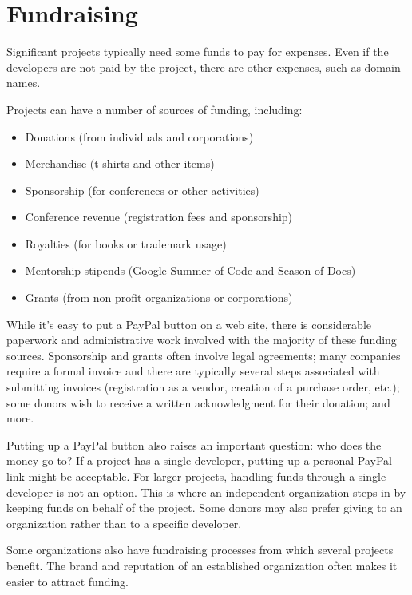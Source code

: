 


\chapter{Fundraising}

Significant projects typically need some funds to pay for expenses.  Even if the developers are not paid by the project, there are other expenses, such as domain names.

Projects can have a number of sources of funding, including:

\begin{itemize}

\item Donations (from individuals and corporations)
\item Merchandise (t-shirts and other items)
\item Sponsorship (for conferences or other activities)
\item Conference revenue (registration fees and sponsorship)
\item Royalties (for books or trademark usage)
\item Mentorship stipends (Google Summer of Code and Season of Docs)
\item Grants (from non-profit organizations or corporations)

\end{itemize}

While it's easy to put a PayPal button on a web site, there is considerable paperwork and administrative work involved with the majority of these funding sources.  Sponsorship and grants often involve legal agreements; many companies require a formal invoice and there are typically several steps associated with submitting invoices (registration as a vendor, creation of a purchase order, etc.); some donors wish to receive a written acknowledgment for their donation; and more.

Putting up a PayPal button also raises an important question: who does the money go to?  If a project has a single developer, putting up a personal PayPal link might be acceptable.  For larger projects, handling funds through a single developer is not an option.  This is where an independent organization steps in by keeping funds on behalf of the project.  Some donors may also prefer giving to an organization rather than to a specific developer.

Some organizations also have fundraising processes from which several projects benefit.  The brand and reputation of an established organization often makes it easier to attract funding.

